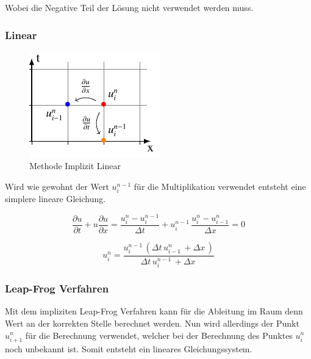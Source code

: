 	Wobei die Negative Teil der L\"osung nicht verwendet werden muss.

\subsubsection{Linear}
\label{burgers:sec:imp_lin}
     \begin{figure}
	\centering
	\includegraphics[height=.4\textwidth]{papers/burgers/BurgersEquation/tikz/linear5/linear5.pdf}
	\caption{Methode Implizit Linear}
	\label{burgers:fig:linear5}
	\end{figure}
	
	Wird wie gewohnt der Wert  $u_{i}^{n-1}$ f\"ur die Multiplikation verwendet entsteht eine simplere lineare Gleichung.
	
	\begin{equation}
	\frac {\partial u}{\partial t}+u{\frac {\partial u}{\partial x}} = \frac{u_{i}^{n}-u_{i}^{n-1}}{\Delta t}+ u_{i}^{n-1}\, \frac{u_{i}^{n}-u_{i-1}^{n}}{\Delta x}=0
	\end{equation}
	
	\begin{equation}
	 u_{i}^{n} = \frac{u^{n-1}_{i}\, \left(\Delta{t}\, u^{n}_{i-1}\, + \Delta{x}\,\right)}{\Delta{t}\, u^{n-1}_{i}\, + \Delta{x}\,}
	\end{equation}




\subsubsection{Leap-Frog Verfahren}

	Mit dem impliziten Leap-Frog Verfahren kann f\"ur die Ableitung im Raum denn Wert an der korrekten Stelle berechnet werden.
	Nun wird allerdings der Punkt  $u_{i+1}^{n}$ f\"ur die Berechnung verwendet, welcher bei der Berechnung des Punktes  $u_{i}^{n}$ noch unbekannt ist.
	Somit entsteht ein lineares Gleichungssystem.

